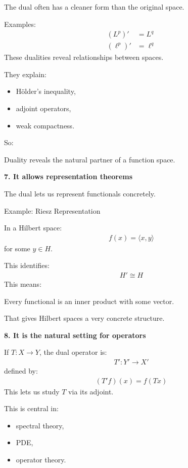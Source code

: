 \documentclass[12pt,a4paper]{report}
\begin{document}
\begin{description}
The dual often has a cleaner form than the original space.

Examples:
\begin{align*}
(L^p)'&=L^q\\
(\ell^p)'&=\ell^q
\end{align*}
These dualities reveal relationships between spaces.

They explain:
	\begin{itemize}
    \item Hölder’s inequality,
    \item adjoint operators,
    \item weak compactness.
	\end{itemize}

So:

\> Duality reveals the natural partner of a function space.

\item \textbf{7. It allows representation theorems}

The dual lets us represent functionals concretely.

\>\>  Example: Riesz Representation

In a Hilbert space:
\begin{align*}
f(x)=\langle x,y\rangle
\end{align*}
for some $y\in H$.

This identifies:
\begin{align*}
H'\cong H
\end{align*}
This means:

\> Every functional is an inner product with some vector.

That gives Hilbert spaces a very concrete structure.

\item \textbf{8. It is the natural setting for operators}

If $T:X\to Y$, the dual operator is:
\begin{align*}
T':Y'\to X'
\end{align*}
defined by:
\begin{align*}
(T'f)(x)=f(Tx)
\end{align*}
This lets us study $T$ via its adjoint.

This is central in:

	\begin{itemize}
    \item spectral theory,
    \item PDE,
    \item operator theory.
	\end{itemize}


\end{description}
\end{document}
